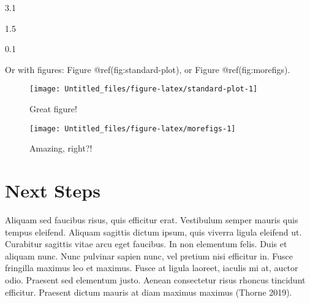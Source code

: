 \documentclass[]{article}
\newenvironment{Shaded}{\begin{snugshade}}{\end{snugshade}}
\newcommand{\DataTypeTok}[1]{\textcolor[rgb]{0.13,0.29,0.53}{#1}}
\newcommand{\DecValTok}[1]{\textcolor[rgb]{0.00,0.00,0.81}{#1}}
\newcommand{\KeywordTok}[1]{\textcolor[rgb]{0.13,0.29,0.53}{\textbf{#1}}}
\newcommand{\NormalTok}[1]{#1}
\newcommand{\OperatorTok}[1]{\textcolor[rgb]{0.81,0.36,0.00}{\textbf{#1}}}
\newcommand{\StringTok}[1]{\textcolor[rgb]{0.31,0.60,0.02}{#1}}
\begin{document}
3.1

1.5

0.1

Or with figures: Figure @ref(fig:standard-plot), or Figure
@ref(fig:morefigs).

\begin{figure}

{\centering \texttt{[image: Untitled\_files/figure-latex/standard-plot-1]} 

}

\caption{Great figure!}\label{fig:standard-plot}
\end{figure}

\begin{Shaded}
\end{Shaded}

\begin{figure}
\texttt{[image: Untitled\_files/figure-latex/morefigs-1]} \caption{Amazing, right?!}\label{fig:morefigs}
\end{figure}

\hypertarget{next-steps}{%
\section{Next Steps}\label{next-steps}}

Aliquam sed faucibus risus, quis efficitur erat. Vestibulum semper
mauris quis tempus eleifend. Aliquam sagittis dictum ipsum, quis viverra
ligula eleifend ut. Curabitur sagittis vitae arcu eget faucibus. In non
elementum felis. Duis et aliquam nunc. Nunc pulvinar sapien nunc, vel
pretium nisi efficitur in. Fusce fringilla maximus leo et maximus. Fusce
at ligula laoreet, iaculis mi at, auctor odio. Praesent sed elementum
justo. Aenean consectetur risus rhoncus tincidunt efficitur. Praesent
dictum mauris at diam maximus maximus (Thorne 2019).
\end{document}
